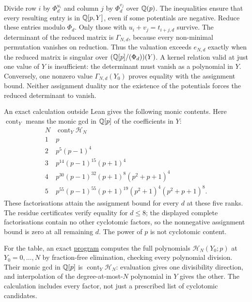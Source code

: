 \documentclass[11pt]{article}
\begin{document}
Divide row $i$ by $\Phi_d^{u_i}$ and column $j$ by $\Phi_d^{v_j}$
over $\mathbb{Q}(p)$. The inequalities ensure that every resulting entry is
in $\mathbb{Q}[p,Y]$, even if some potentials are negative. Reduce these
entries modulo $\Phi_d$. Only those with
$u_i+v_j=t_{i+j,d}$ survive. The determinant of the reduced matrix is
$\Gamma_{N,d}$, because every non-minimal permutation vanishes on
reduction. Thus the valuation exceeds $e_{N,d}$ exactly when the
reduced matrix is singular over $(\mathbb{Q}[p]/(\Phi_d))(Y)$.
A kernel relation valid at just one value of $Y$ is insufficient:
the determinant must vanish as a polynomial in $Y$. Conversely, one
nonzero value $\Gamma_{N,d}(Y_0)$ proves equality with the assignment
bound. Neither assignment duality nor the existence of the potentials
forces the reduced determinant to vanish.


An exact calculation outside Lean gives the following monic contents.
Here $\operatorname{cont}_Y$ means the monic gcd in $\mathbb{Q}[p]$ of the
coefficients in $Y$:
\[
\begin{array}{c|l}
N&\operatorname{cont}_Y\mathcal H_N\\\hline
1&p\\
2&p^5(p-1)^4\\
3&p^{14}(p-1)^{15}(p+1)^4\\
4&p^{30}(p-1)^{32}(p+1)^8(p^2+p+1)^4\\
5&p^{55}(p-1)^{55}(p+1)^{19}(p^2+1)^4(p^2+p+1)^8.
\end{array}
\]
These factorisations attain the assignment bound for every $d$ at
these five ranks. The residue certificates verify equality for
$d\le8$; the displayed complete factorisations contain no other
cyclotomic factors, so the nonnegative assignment bound is zero at
all remaining $d$. The power of $p$ is not cyclotomic content.

For the table, an exact
\href{https://github.com/wcook04/plectis-erdos/blob/4beca4ad0c00a626def9c73f2420e20ebf8d1968/research/experiments/erdos1049/cyclotomic_content.py}{program}
computes the full polynomials
$\mathcal H_N(Y_0;p)$ at $Y_0=0,\ldots,N$ by fraction-free
elimination, checking every polynomial division. Their monic gcd in
$\mathbb{Q}[p]$ is $\operatorname{cont}_Y\mathcal H_N$: evaluation gives one
divisibility direction, and interpolation of the degree-at-most-$N$
polynomial in $Y$ gives the other. The calculation includes every
factor, not just a prescribed list of cyclotomic candidates.
\end{document}

